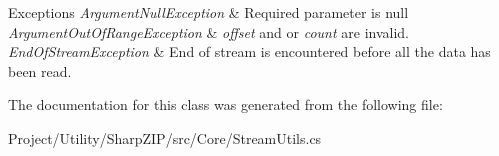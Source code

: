 \begin{DoxyExceptions}{Exceptions}
{\em Argument\+Null\+Exception} & Required parameter is null\\
\hline
{\em Argument\+Out\+Of\+Range\+Exception} & {\itshape offset}  and or {\itshape count}  are invalid.\\
\hline
{\em End\+Of\+Stream\+Exception} & End of stream is encountered before all the data has been read.\\
\hline
\end{DoxyExceptions}


The documentation for this class was generated from the following file\+:\begin{DoxyCompactItemize}
\item 
Project/\+Utility/\+Sharp\+Z\+I\+P/src/\+Core/Stream\+Utils.\+cs\end{DoxyCompactItemize}

